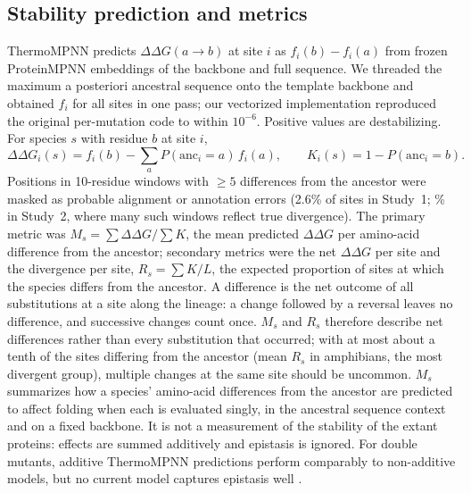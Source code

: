 \documentclass[11pt]{article}
\newcommand{\ddG}{$\Delta\Delta G$}
\begin{document}
\subsection{Stability prediction and metrics}
ThermoMPNN predicts $\Delta\Delta G(a\rightarrow b)$ at site $i$ as $f_i(b)-f_i(a)$ from frozen ProteinMPNN embeddings of the backbone and full sequence. We threaded the maximum a posteriori ancestral sequence onto the template backbone and obtained $f_i$ for all sites in one pass; our vectorized implementation reproduced the original per-mutation code to within $10^{-6}$. Positive values are destabilizing. For species $s$ with residue $b$ at site $i$,
\begin{equation}
\Delta\Delta G_i(s) = f_i(b) - \sum_a P(\mathrm{anc}_i = a)\, f_i(a), \qquad K_i(s) = 1 - P(\mathrm{anc}_i = b).
\end{equation}
Positions in 10-residue windows with $\geq 5$ differences from the ancestor were masked as probable alignment or annotation errors (2.6\% of sites in Study~1; \RMaskPct\% in Study~2, where many such windows reflect true divergence). The primary metric was $M_s = \sum \Delta\Delta G/\sum K$, the mean predicted \ddG{} per amino-acid difference from the ancestor; secondary metrics were the net \ddG{} per site and the divergence per site, $R_s = \sum K/L$, the expected proportion of sites at which the species differs from the ancestor. A difference is the net outcome of all substitutions at a site along the lineage: a change followed by a reversal leaves no difference, and successive changes count once. $M_s$ and $R_s$ therefore describe net differences rather than every substitution that occurred; with at most about a tenth of the sites differing from the ancestor (mean $R_s$ \RRAmphibians{} in amphibians, the most divergent group), multiple changes at the same site should be uncommon. $M_s$ summarizes how a species' amino-acid differences from the ancestor are predicted to affect folding when each is evaluated singly, in the ancestral sequence context and on a fixed backbone. It is not a measurement of the stability of the extant proteins: effects are summed additively and epistasis is ignored. For double mutants, additive ThermoMPNN predictions perform comparably to non-additive models, but no current model captures epistasis well \citep{Dieckhaus2025}.
\end{document}
